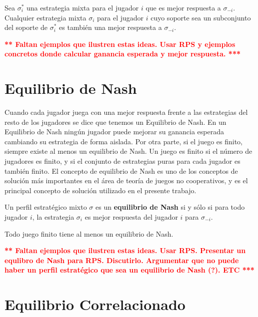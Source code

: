 \begin{theorem}
\label{theo:mejor-respuesta}
Sea $\sigma^*_i$ una estrategia mixta para el jugador $i$ que es mejor respuesta a $\sigma_{-i}$. Cualquier estrategia mixta $\sigma_i$ para el jugador $i$ cuyo soporte sea un subconjunto del soporte de $\sigma^*_i$ es también una mejor respuesta a $\sigma_{-i}$.
\end{theorem}

\noindent\textcolor{red}{\bf*** Faltan ejemplos que ilustren estas ideas. Usar RPS y ejemplos concretos donde calcular ganancia esperada y mejor respuesta. ***}

\section{Equilibrio de Nash}
Cuando cada jugador juega con una mejor respuesta frente a las estrategias del resto de los jugadores se dice que tenemos un Equilibrio de Nash. En un Equilibrio de Nash ningún jugador puede mejorar su ganancia esperada cambiando su estrategia de forma aislada. Por otra parte, si el juego es finito, siempre existe al menos un equilibrio de Nash. Un juego es finito si el número de jugadores es finito, y si el conjunto de estrategias puras para cada jugador es también finito. El concepto de equilibrio de Nash es uno de los conceptos de solución más importantes en el área de teoría de juegos no cooperativos, y es el principal concepto de solución utilizado en el presente trabajo.

\begin{definition}
\label{def:equilibrio-nash} Un perfil estratégico mixto $\sigma$ es un \textbf{equilibrio de Nash} si y s\'olo si para todo jugador $i$, la estrategia $\sigma_i$ es mejor respuesta del jugador $i$ para $\sigma_{-i}$.
\end{definition}

\begin{theorem}
\label{theo:existencia-nash}
Todo juego finito tiene al menos un equilibrio de Nash.
\end{theorem}

\noindent\textcolor{red}{\bf*** Faltan ejemplos que ilustren estas ideas. Usar RPS. Presentar un equlibro de Nash para RPS. Discutirlo. Argumentar que no puede haber un perfil estratégico que sea un equilibrio de Nash (?). ETC ***}


\section{Equilibrio Correlacionado}

